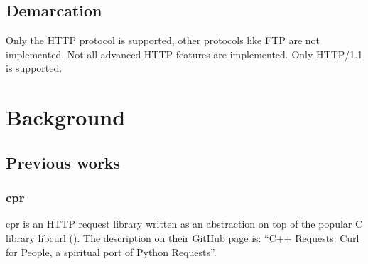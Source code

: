\documentclass[12pt, a4paper]{article}
\begin{document}
\subsection{Demarcation}
Only the HTTP protocol is supported, other protocols like FTP are not implemented. Not all advanced HTTP features are implemented. Only HTTP/1.1 is supported.

\clearpage
\section{Background}
\subsection{Previous works}
\subsubsection{cpr}
cpr is an HTTP request library written as an abstraction on top of the popular C library libcurl (\cite{Cpr}). The description on their GitHub page is: “C++ Requests: Curl for People, a spiritual port of Python Requests”.
\end{document}
